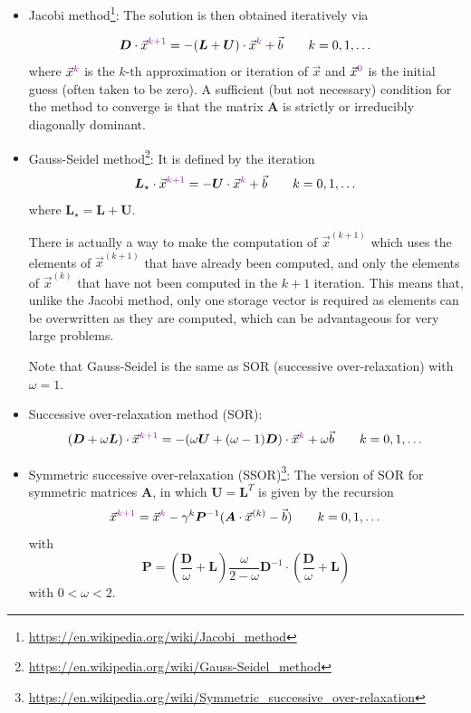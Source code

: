 \begin{itemize}
\item Jacobi method\footnote{\url{https://en.wikipedia.org/wiki/Jacobi_method}}: 
The solution is then obtained iteratively via

\begin{equation}
{\bm D} \cdot \vec{x}^{{\color{Fuchsia}k+1}} = -({\bm L} + {\bm U}) \cdot \vec{x}^{\color{Fuchsia}k} 
+ \vec{b}
\qquad k=0,1,\dots
\end{equation}
where 
$\vec{x}^{\color{Fuchsia}k}$ is the $k$-th approximation or iteration of $\vec{x}$ and
$\vec{x}^{\color{Fuchsia}0}$ is the initial guess (often taken to be zero).
A sufficient (but not necessary) condition for the method to converge is that the matrix ${\bm A}$ 
is strictly or irreducibly diagonally dominant.

\item Gauss-Seidel method\footnote{\url{https://en.wikipedia.org/wiki/Gauss-Seidel_method}}: 
It is defined by the iteration
\begin{equation}
{\bm L_\star} \cdot \vec{x}^{{\color{Fuchsia}k+1}} = - {\bm U} \cdot \vec{x}^{\color{Fuchsia}k} 
+ \vec{b}
\qquad k=0,1,\dots
\end{equation}
where ${\bm L}_\star = {\bm L}+{\bm U}$.

There is actually a way to make the computation of $\vec{x}^{(k+1)}$ which uses the elements of 
$\vec{x}^{(k+1)}$ that have already been computed, and only the elements of $\vec{x}^{(k)}$ that 
have not been computed in the $k+1$ iteration. 
This means that, unlike the Jacobi method, only one storage vector is required as elements 
can be overwritten as they are computed, which can be advantageous for very large problems. 

Note that Gauss-Seidel is the same as SOR (successive over-relaxation) with $\omega = 1$.

\item Successive over-relaxation method (SOR):
\begin{equation}
({\bm D} + \omega {\bm L}) \cdot \vec{x}^{{\color{Fuchsia}k+1}} 
= - (\omega{\bm U} + (\omega-1) {\bm D}) \cdot \vec{x}^{\color{Fuchsia}k} 
+ \omega \vec{b}
\qquad k=0,1,\dots
\end{equation}


\item Symmetric successive over-relaxation 
(SSOR)\footnote{\url{https://en.wikipedia.org/wiki/Symmetric_successive_over-relaxation}}:
The version of SOR for symmetric matrices ${\bm A}$, in which ${\bm U}={\bm L}^T$ is 
given by the recursion
\begin{equation}
\vec{x}^{{\color{Fuchsia}k+1}} 
=  \vec{x}^{\color{Fuchsia}k} 
-\gamma^k {\bm P}^{-1} ( {\bm A}\cdot \vec{x}^{(k)} -\vec{b})
\qquad k=0,1,\dots
\end{equation}
with 
\[
{\bm P} = \left(\frac{\bm D}{\omega}+{\bm L}\right) \frac{\omega}{2-\omega} {\bm D}^{-1}\cdot
\left(\frac{\bm D}{\omega}+ {\bm L} \right)
\]
with $0<\omega<2$.



\end{itemize}

